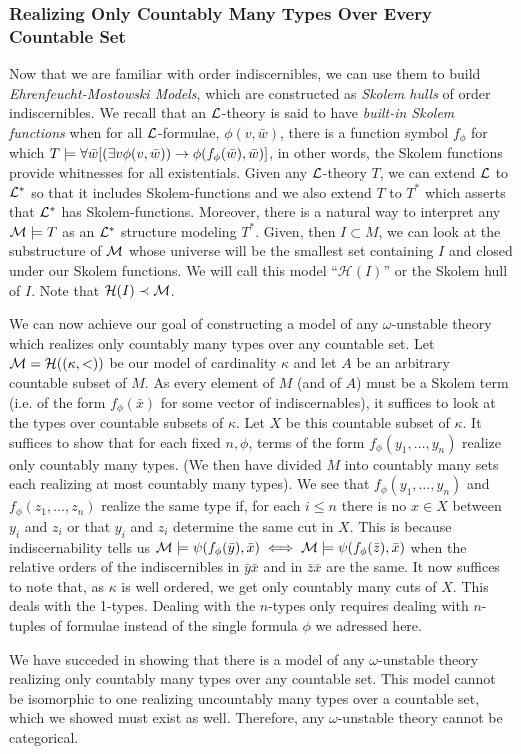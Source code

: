 \subsubsection{Realizing Only Countably Many Types Over Every Countable Set}
Now that we are familiar with order indiscernibles, we can use them to build \textit{Ehrenfeucht-Mostowski Models}, which are constructed as \textit{Skolem hulls} of order indiscernibles. 
We recall that an \(\mathcal{L}\)-theory is said to have \textit{built-in Skolem functions} when for all \(\mathcal{L}\)-formulae, \(\phi(v, \bar{w})\), there is a function symbol \(f_\phi\) for which 
\(T \models \forall \bar{w} [(\exists v \phi(v, \bar{w})) \to \phi(f_\phi(\bar{w}), \bar{w})]\), in other words, the Skolem functions provide whitnesses for all existentials. 
Given any \(\mathcal{L}\)-theory \(T\), we can extend \(\mathcal{L}\) to \(\mathcal{L}^*\) so that it includes Skolem-functions and we also extend \(T\) to \(T^*\) which asserts that \(\mathcal{L}^*\) has Skolem-functions. 
Moreover, there is a natural way to interpret any \(\mathcal{M} \models T\) as an \(\mathcal{L}^*\) structure modeling \(T^*\).
Given, then \(I \subset M\), we can look at the substructure of \(\mathcal{M}\) whose universe will be the smallest set containing \(I\) and closed under our Skolem functions. 
We will call this model ``\(\mathcal{H}(I)\)'' or the Skolem hull of \(I\).
Note that \(\mathcal{H}(I) \prec \mathcal{M}\).

We can now achieve our goal of constructing a model of any \(\omega\)-unstable theory which realizes only countably many types over any countable set. 
Let \(\mathcal{M} = \mathcal{H}((\kappa, <))\) be our model of cardinality \(\kappa\) and let \(A\) be an arbitrary countable subset of \(M\). 
As every element of \(M\) (and of \(A\)) must be a Skolem term (i.e. of the form \(f_\phi(\bar{x})\) for some vector of indiscernables), it suffices to look at the types over countable subsets of \(\kappa\).
Let \(X\) be this countable subset of \(\kappa\). 
It suffices to show that for each fixed \(n, \phi\), terms of the form \(f_\phi(y_1, \ldots, y_n)\) realize only countably many types. 
(We then have divided \(M\) into countably many sets each realizing at most countably many types).
We see that \(f_\phi(y_1, \ldots, y_n)\) and \(f_\phi(z_1, \ldots, z_n)\) realize the same type if, for each \(i \leq n\) there is no \(x \in X\) between \(y_i\) and \(z_i\) or that \(y_i\) and \(z_i\) determine the same cut in \(X\).  
This is because indiscernability tells us \(\mathcal{M} \models \psi(f_\phi(\bar{y}), \bar{x}) \iff \mathcal{M} \models \psi(f_\phi(\bar{z}), \bar{x})\) when the relative orders of the indiscernibles in \(\bar{y}\bar{x}\) and in \(\bar{z}\bar{x}\) are the same. 
It now suffices to note that, as \(\kappa\) is well ordered, we get only countably many cuts of \(X\). 
This deals with the 1-types. Dealing with the \(n\)-types only requires dealing with \(n\)-tuples of formulae instead of the single formula \(\phi\) we adressed here. 

We have succeded in showing that there is a model of any \(\omega\)-unstable theory realizing only countably many types over any countable set.
This model cannot be isomorphic to one realizing uncountably many types over a countable set, which we showed must exist as well. 
Therefore, any \(\omega\)-unstable theory cannot be categorical.
